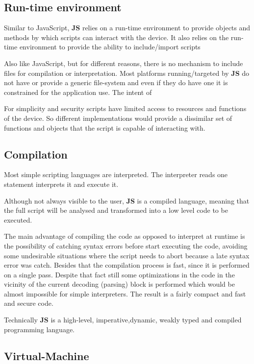 \subsection{Run-time environment}

Similar to JavaScript, \textbf{\textmu JS} relies on a run-time environment to provide objects and methods by which scripts can interact with the device. It also relies on the run-time environment to provide the ability to include/import scripts 

Also like JavaScript, but for different reasons, there is no mechanism to include files for compilation or interpretation. Most platforms running/targeted by \textbf{\textmu JS} do not have or provide a generic file-system and even if they do have one it is constrained for the application use. The intent of 

For simplicity and security scripts have limited access to resources and functions of the device. So different implementations would provide a dissimilar set of functions and objects that the script is capable of interacting with. 

\subsection{Compilation}

Most simple scripting languages are interpreted. The interpreter reads one statement interprets it and execute it. 

Although not always visible to the user, \textbf{\textmu JS} is a compiled language, meaning that the full script will be analysed and transformed into a low level code to be executed.

The main advantage of compiling the code as opposed to interpret at runtime is the possibility of catching syntax errors before start executing the code, avoiding some undesirable situations where the script needs to abort because a late syntax error was catch. Besides that the compilation process is fast, since it is performed on a single pass. Despite that fact still some optimizations in the code in the vicinity of the current decoding (parsing) block is performed which would be almost impossible for simple interpreters. The result is a fairly compact and fast and secure code.

Technically \textbf{\textmu JS} is a high-level, imperative,dynamic, weakly typed and compiled programming language. 

\subsection{Virtual-Machine}

